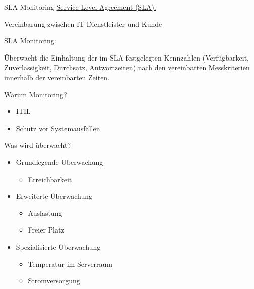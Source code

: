 \documentclass[12pt]{beamer}
\begin{document}
\begin{frame}{SLA Monitoring}
	\underline{Service Level Agreement (SLA):}\medskip
	
	Vereinbarung zwischen IT-Dienstleister und Kunde\bigskip
	
	\underline{SLA Monitoring:}\medskip
	
	Überwacht die Einhaltung der im SLA festgelegten Kennzahlen (Verfügbarkeit, Zuverlässigkeit, Durchsatz, Antwortzeiten) nach den vereinbarten Messkriterien innerhalb der vereinbarten Zeiten.
\end{frame}
\begin{frame}{Warum Monitoring?}
	\begin{itemize}
		\item ITIL
		\item Schutz vor Systemausfällen
		
	\end{itemize}
\end{frame}
\begin{frame}{Was wird überwacht?}
	\begin{center}
		\begin{itemize}
			\item Grundlegende Überwachung
			\begin{itemize}
				\item Erreichbarkeit
			\end{itemize}
			\item Erweiterte Überwachung
			\begin{itemize}
				\item Auslastung
				\item Freier Platz
			\end{itemize}
			\item Spezialisierte Überwachung
			\begin{itemize}
				\item Temperatur im Serverraum
				\item Stromversorgung
			\end{itemize}
		\end{itemize}
	\end{center}
	
	
\end{frame}
\end{document}
